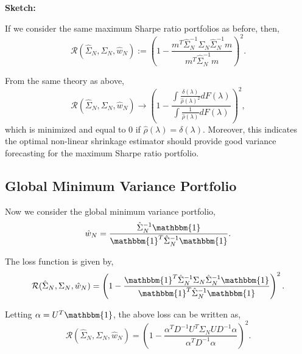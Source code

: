 \documentclass{article}
\begin{document}
{\bf Sketch:}

If we consider the same maximum Sharpe ratio portfolios as before, then,
$$
	\mathcal{R}(\hat{\Sigma}_N, \Sigma_N, \hat{w}_N)
		:= \left(
				1 - \frac{m^T \hat{\Sigma}_N^{-1} \Sigma_N \hat{\Sigma}_N^{-1} m} 
								 {m^T \hat{\Sigma}_N^{-1} m}
			\right)^2.
$$


From the same theory as above,
$$
	\mathcal{R}(\hat{\Sigma}_N, \Sigma_N, \hat{w}_N)
	 	\rightarrow 
		 	\left(
				1 - \frac{\int \frac{\delta(\lambda)}{\hat{\rho}(\lambda)^2}dF(\lambda)}
				 				 {\int \frac{1}{\hat{\rho}(\lambda)}dF(\lambda)}
			\right)^2,
$$
which is minimized and equal to 0 if $\hat{\rho}(\lambda) = \delta(\lambda).$
Moreover, this indicates the optimal non-linear shrinkage estimator should
provide good variance forecasting for the maximum Sharpe ratio portfolio.



\subsection{Global Minimum Variance Portfolio}

Now we consider the global minimum variance portfolio,
$$
	\hat{w}_N = \frac{\hat{\Sigma}_N^{-1}\mathbbm{1}}
						{\mathbbm{1}^T\hat{\Sigma}_N^{-1}\mathbbm{1}}.
$$

The loss function is given by,
$$
	\mathcal{R}(\hat{\Sigma}_N, \Sigma_N, \hat{w}_N)
		= \left(
				1 - 
					\frac{\mathbbm{1}^T \hat{\Sigma}_N^{-1} \Sigma_N \hat{\Sigma}_N^{-1} \mathbbm{1}}
						   {\mathbbm{1}^T \hat{\Sigma}_N^{-1} \mathbbm{1}}
			\right)^2.
$$

Letting $\alpha = U^T \mathbbm{1}$, the above loss can be written as,
$$
	\mathcal{R}(\hat{\Sigma}_N, \Sigma_N, \hat{w}_N)
		= \left(
				1 - \frac{\alpha^T D^{-1} U^T\Sigma_N U D^{-1} \alpha}
						   {\alpha^T D^{-1} \alpha}
			\right)^2.
$$
\end{document}
